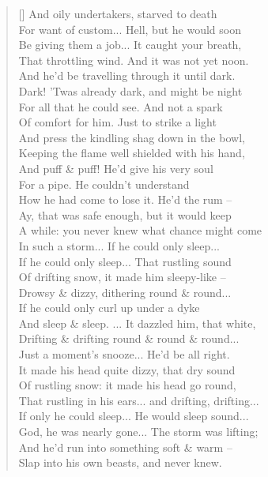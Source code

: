 \documentclass[MAIN]{subfiles}
\begin{document}
\begin{verse}[\versewidth]
And oily undertakers, starved to death\\
For want of custom... Hell, but he would soon\\
Be giving them a job... It caught your breath,\\
That throttling wind. And it was not yet noon.\\
And he'd be travelling through it until dark.\\
Dark! 'Twas already dark, and might be night\\
For all that he could see. And not a spark\\
Of comfort for him. Just to strike a light\\
And press the kindling shag down in the bowl,\\
Keeping the flame well shielded with his hand,\\
And puff \& puff! He'd give his very soul\\
For  a pipe. He couldn't understand\\
How he had come to lose it. He'd the rum --\\
Ay, that was safe enough, but it would keep\\
A while: you never knew what chance might come\\
In such a storm... If he could only sleep...\\
If he could only sleep... That rustling sound\\
Of drifting snow, it made him sleepy-like --\\
Drowsy \& dizzy, dithering round \& round...\\
If he could only curl up under a dyke\\
And sleep \& sleep. ... It dazzled him, that white,\\
Drifting \& drifting round \& round \& round...\\
Just  a moment's snooze... He'd be all right.\\
It made his head quite dizzy, that dry sound\\
Of rustling snow: it made his head go round,\\
That rustling in his ears... and drifting, drifting...\\
If only he could sleep... He would sleep sound...\\
God, he was nearly gone... The storm was lifting;\\
And he'd run into something soft \& warm --\\
Slap into his own beasts, and never knew.\\

\end{verse}
\end{document}
